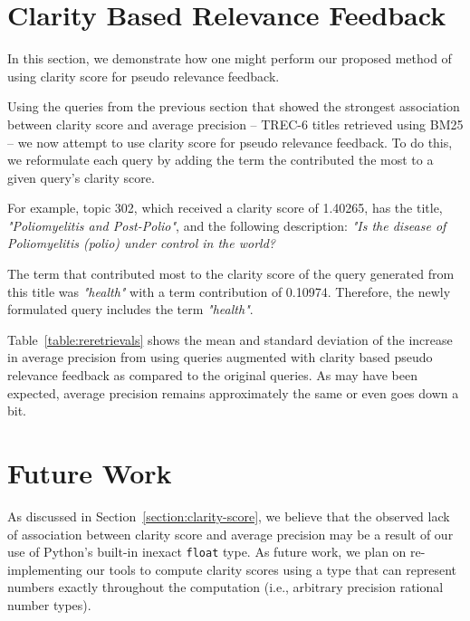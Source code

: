 \documentclass[format=sigconf, screen=true, review=false]{acmart}
\newcommand{\inlinecode}[1]{\texttt{#1}}
\begin{document}


\section{Clarity Based Relevance Feedback}
In this section, we demonstrate how one might perform our proposed method of using clarity score for pseudo relevance feedback.

Using the queries from the previous section that showed the strongest association between clarity score and average precision -- TREC-6 titles retrieved using BM25 -- we now attempt to use clarity score for pseudo relevance feedback.
To do this, we reformulate each query by adding the term the contributed the most to a given query's clarity score.

For example, topic 302, which received a clarity score of 1.40265, has the title, \textit{"Poliomyelitis and Post-Polio"}, and the following description: \textit{"Is the disease of Poliomyelitis (polio) under control in the world?}

The term that contributed most to the clarity score of the query generated from this title was \textit{"health"} with a term contribution of 0.10974.
Therefore, the newly formulated query includes the term \textit{"health"}.

Table~\ref{table:reretrievals} shows the mean and standard deviation of the increase in average precision from using queries augmented with clarity based pseudo relevance feedback as compared to the original queries.
As may have been expected, average precision remains approximately the same or even goes down a bit.



\section{Future Work}
As discussed in Section~\ref{section:clarity-score}, we believe that the observed lack of association between clarity score and average precision may be a result of our use of Python's built-in inexact \inlinecode{float} type.
As future work, we plan on re-implementing our tools to compute clarity scores using a type that can represent numbers exactly throughout the computation (i.e., arbitrary precision rational number types).
\end{document}
